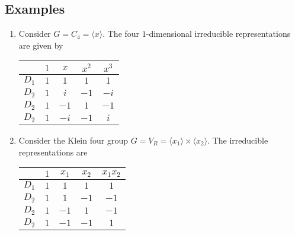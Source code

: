 \documentclass[a4paper]{article}
\begin{document}
\subsection{Examples}
\begin{eg}\leavevmode
  \begin{enumerate}
    \item Consider $G = C_4 = \langle x\rangle$. The four $1$-dimensional irreducible representations are given by
      \begin{center}
        \begin{tabular}{|c|c|c|c|c|}
          \hline
          & $1$ & $x$ & $x^2$ & $x^3$\\
          \hline
          $D_1$ & $1$ & $1$ & $1$ & $1$\\
          $D_2$ & $1$ & $i$ & $-1$ & $-i$\\
          $D_2$ & $1$ & $-1$ & $1$ & $-1$\\
          $D_2$ & $1$ & $-i$ & $-1$ & $i$\\
          \hline
        \end{tabular}
      \end{center}
    \item Consider the Klein four group $G = V_R = \langle x_1 \rangle \times \langle x_2\rangle$. The irreducible representations are
      \begin{center}
        \begin{tabular}{|c|c|c|c|c|}
          \hline
          & $1$ & $x_1$ & $x_2$ & $x_1x_2$\\
          \hline
          $D_1$ & $1$ & $1$ & $1$ & $1$\\
          $D_2$ & $1$ & $1$ & $-1$ & $-1$\\
          $D_2$ & $1$ & $-1$ & $1$ & $-1$\\
          $D_2$ & $1$ & $-1$ & $-1$ & $1$\\
          \hline
        \end{tabular}
      \end{center}
  \end{enumerate}
\end{eg}
\end{document}
